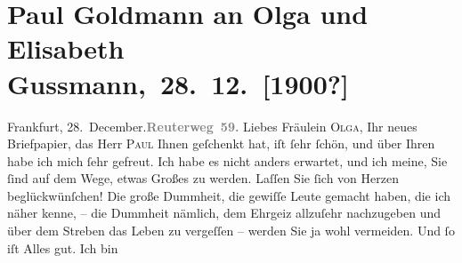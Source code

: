 

         
         \renewcommand{\erwaehntePersonen}{Personen: Peter Altenberg, Paul Goldmann, Clementine Goldmann, Fedor Mamroth, Paul Marx, Guy de Maupassant, Vally Rosengart, Josef Rosengart, Olga Schnitzler, Elisabeth Steinrück}
         \renewcommand{\erwaehnteOrte}{Orte: Berlin, Frankfurt am Main, Reuterweg, Wien}
         \renewcommand{\erwaehnteWerke}{Werke: Rosenmontag}
               \section[ Paul Goldmann an Olga und Elisabeth Gussmann, 28. 12. {[}1900?{]}]{ Paul Goldmann an Olga und Elisabeth Gussmann, 28. 12. {[}1900?{]}}\nopagebreak{}\rehead{ }\begin{ledgroupsized}[t]{13cm}\normalsize\beginnumbering{} \toendnotes[C]{\smallbreak\pagebreak[2]} 
\toendnotes[C]{\smallbreak}\pstart
           \noindent{}Frankfurt, 28. December.\hfill {\pb}\textcolor{gray}{\textbf{Reuterweg 59.}}\pend
           \pstart\center{}Liebes Fräulein \textsc{Olga},\pend\pstart
           Ihr neues Briefpapier, das Herr \textsc{Paul} Ihnen geſchenkt hat, iſt ſehr ſchön, und über Ihren \label{K_L03538-1v}\label{K_L03538-1h} habe ich mich ſehr gefreut. Ich habe es nicht anders erwartet, und ich meine,
               Sie ſind auf dem Wege, etwas Großes zu werden. Laſſen Sie ſich von Herzen
               beglückwünſchen! Die große Dummheit, die gewiſſe Leute gemacht haben, die ich näher
               kenne, – die Dummheit nämlich, dem Ehrgeiz allzuſehr nachzugeben und über dem Streben
               das Leben zu vergeſſen – werden Sie ja wohl vermeiden. Und ſo iſt Alles gut. Ich bin

\end{ledgroupsized}

